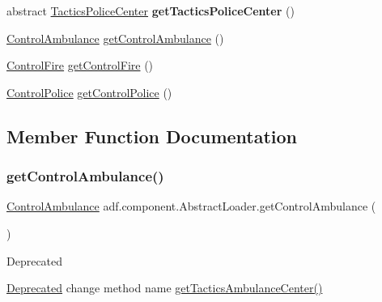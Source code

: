 \begin{DoxyCompactItemize}
\item 
\hypertarget{classadf_1_1component_1_1AbstractLoader_a37df58a82bd68958ef32a8db70e4d2dc}{}\label{classadf_1_1component_1_1AbstractLoader_a37df58a82bd68958ef32a8db70e4d2dc} 
abstract \hyperlink{classadf_1_1component_1_1tactics_1_1center_1_1TacticsPoliceCenter}{Tactics\+Police\+Center} {\bfseries get\+Tactics\+Police\+Center} ()
\item 
\hyperlink{classadf_1_1component_1_1control_1_1ControlAmbulance}{Control\+Ambulance} \hyperlink{classadf_1_1component_1_1AbstractLoader_a2044c317869b16349d4fdbf7d5d50dcd}{get\+Control\+Ambulance} ()
\item 
\hyperlink{classadf_1_1component_1_1control_1_1ControlFire}{Control\+Fire} \hyperlink{classadf_1_1component_1_1AbstractLoader_a66e4649d775d291dda3e5b977596bccf}{get\+Control\+Fire} ()
\item 
\hyperlink{classadf_1_1component_1_1control_1_1ControlPolice}{Control\+Police} \hyperlink{classadf_1_1component_1_1AbstractLoader_a2917adfedf677a3af006521e64996a42}{get\+Control\+Police} ()
\end{DoxyCompactItemize}


\subsection{Member Function Documentation}
\hypertarget{classadf_1_1component_1_1AbstractLoader_a2044c317869b16349d4fdbf7d5d50dcd}{}\label{classadf_1_1component_1_1AbstractLoader_a2044c317869b16349d4fdbf7d5d50dcd} 
\subsubsection{\texorpdfstring{get\+Control\+Ambulance()}{getControlAmbulance()}}
{\footnotesize\ttfamily \hyperlink{classadf_1_1component_1_1control_1_1ControlAmbulance}{Control\+Ambulance} adf.\+component.\+Abstract\+Loader.\+get\+Control\+Ambulance (\begin{DoxyParamCaption}{ }\end{DoxyParamCaption})}

\begin{DoxyRefDesc}{Deprecated}
\item[\hyperlink{deprecated__deprecated000006}{Deprecated}]change method name \hyperlink{}{get\+Tactics\+Ambulance\+Center()} \end{DoxyRefDesc}
\hypertarget{classadf_1_1component_1_1AbstractLoader_a66e4649d775d291dda3e5b977596bccf}{}\label{classadf_1_1component_1_1AbstractLoader_a66e4649d775d291dda3e5b977596bccf} 
